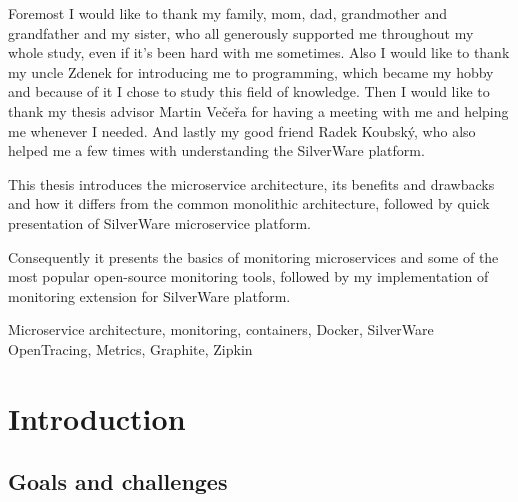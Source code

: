 \documentclass[12pt,oneside]{fithesis2}
\begin{document}
\sloppy

  \FrontMatter                    %
    \ThesisTitlePage                %
    \begin{ThesisDeclaration}       %
      \DeclarationText
      \AdvisorName
    \end{ThesisDeclaration}
    \begin{ThesisThanks}            %
      Foremost I would like to thank my family, mom, dad, grandmother and grandfather and my sister, who all generously supported me throughout my whole study, even if it's been hard with me sometimes. Also I would like to thank my uncle Zdenek for introducing me to programming, which became my hobby and because of it I chose to study this field of knowledge. Then I would like to thank my thesis advisor Martin Večeřa for having a meeting with me and helping me whenever I needed. And lastly my good friend Radek Koubský, who also helped me a few times with understanding the SilverWare platform.
    \end{ThesisThanks}
    \begin{ThesisAbstract}          %
This thesis introduces the microservice architecture, its benefits and drawbacks and how it differs from the common monolithic architecture, followed by quick presentation of SilverWare microservice platform.

Consequently it presents the basics of monitoring microservices and some of the most popular open-source monitoring tools, followed by my implementation of monitoring extension for SilverWare platform.
    \end{ThesisAbstract}
    \begin{ThesisKeyWords}          %
       Microservice architecture, monitoring, containers, Docker, SilverWare OpenTracing, Metrics, Graphite, Zipkin 
    \end{ThesisKeyWords}
    \tableofcontents                %
  
  \MainMatter                     %
\chapter{Introduction}

\section{Goals and challenges}
\end{document}
